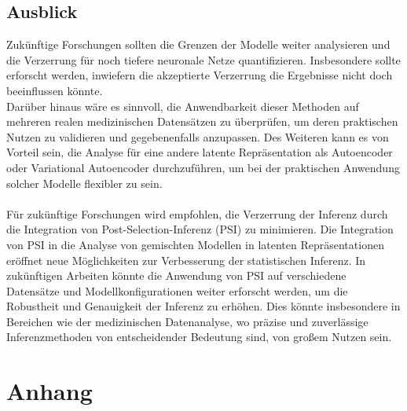 \documentclass[%
thesis=student,%
coverpage=false,%
titlepage=false,%
headmarks=true, %
german,%
font=libertine, %
math=newpxtx, %
BCOR=5mm,%
coverBCOR=11mm%
]{tumbook}
\theoremstyle{break}
\begin{document}
\section{Ausblick}
Zukünftige Forschungen sollten die Grenzen der Modelle weiter analysieren und die Verzerrung für noch tiefere neuronale Netze quantifizieren. Insbesondere sollte erforscht werden, inwiefern die akzeptierte Verzerrung die Ergebnisse nicht doch beeinflussen könnte.\\
Darüber hinaus wäre es sinnvoll, die Anwendbarkeit dieser Methoden auf mehreren realen medizinischen Datensätzen zu überprüfen, um deren praktischen Nutzen zu validieren und gegebenenfalls anzupassen. Des Weiteren kann es von Vorteil sein, die Analyse für eine andere latente Repräsentation als Autoencoder oder Variational Autoencoder durchzuführen, um bei der praktischen Anwendung solcher Modelle flexibler zu sein.\\
\\
Für zukünftige Forschungen wird empfohlen, die Verzerrung der Inferenz durch die Integration von Post-Selection-Inferenz (PSI) zu minimieren. Die Integration von PSI in die Analyse von gemischten Modellen in latenten Repräsentationen eröffnet neue Möglichkeiten zur Verbesserung der statistischen Inferenz. In zukünftigen Arbeiten könnte die Anwendung von PSI auf verschiedene Datensätze und Modellkonfigurationen weiter erforscht werden, um die Robustheit und Genauigkeit der Inferenz zu erhöhen. Dies könnte insbesondere in Bereichen wie der medizinischen Datenanalyse, wo präzise und zuverlässige Inferenzmethoden von entscheidender Bedeutung sind, von großem Nutzen sein.
\\
\chapter{Anhang}
\end{document}

